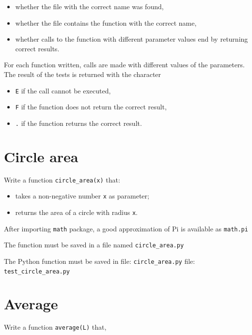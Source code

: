 \begin{itemize}
\tightlist
\item
  whether the file with the correct name was found,
\item
  whether the file contains the function with the correct name,
\item
  whether calls to the function with different parameter values end by
  returning correct results.
\end{itemize}

For each function written, calls are made with different values of the
parameters. The result of the tests is returned with the character

\begin{itemize}
\tightlist
\item
  \texttt{E} if the call cannot be executed,
\item
  \texttt{F} if the function does not return the correct result,
\item
  \texttt{.} if the function returns the correct result.
\end{itemize}

\pagebreak

\section{Circle area}\label{circle-area}

Write a function \texttt{circle\_area(x)} that:

\begin{itemize}
\tightlist
\item
  takes a non-negative number \texttt{x} as parameter;
\item
  returns the area of a circle with radius \texttt{x}.
\end{itemize}

After importing \texttt{math} package, a good approximation of Pi is
available as \texttt{math.pi}

The function must be saved in a file named \texttt{circle\_area.py}

The Python function must be saved in file: \texttt{circle\_area.py}
\Test file: \texttt{test\_circle\_area.py}

\pagebreak

\section{Average}\label{average}

Write a function \texttt{average(L)} that,

